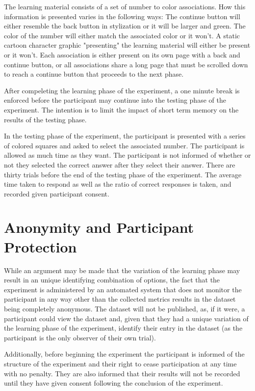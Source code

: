 \documentclass[12pt]{report}
\begin{document}
The learning material consists of a set of number to color associations. How this information is presented varies in the following ways: The continue button will either resemble the back button in stylization or it will be larger and green. The color of the number will either match the associated color or it won't. A static cartoon character graphic "presenting" the learning material will either be present or it won't. Each association is either present on its own page with a back and continue button, or all associations share a long page that must be scrolled down to reach a continue button that proceeds to the next phase.

After compeleting the learning phase of the experiment, a one minute break is enforced before the participant may continue into the testing phase of the experiment. The intention is to limit the impact of short term memory on the results of the testing phase.

In the testing phase of the experiment, the participant is presented with a series of colored squares and asked to select the associated number. The participant is allowed as much time as they want. The participant is not informed of whether or not they selected the correct answer after they select their answer. There are thirty trials before the end of the testing phase of the experiment. The average time taken to respond as well as the ratio of correct responses is taken, and recorded given participant consent.

\section{Anonymity and Participant Protection}

While an argument may be made that the variation of the learning phase may result in an unique identifying combination of options, the fact that the experiment is administered by an automated system that does not monitor the participant in any way other than the collected metrics results in the dataset being completely anonymous. The dataset will not be published, as, if it were, a participant could view the dataset and, given that they had a unique variation of the learning phase of the experiment, identify their entry in the dataset (as the participant is the only observer of their own trial).

Additionally, before beginning the experiment the participant is informed of the structure of the experiment and their right to cease participation at any time with no penalty. They are also informed that their results will not be recorded until they have given consent following the conclusion of the experiment.
\end{document}
